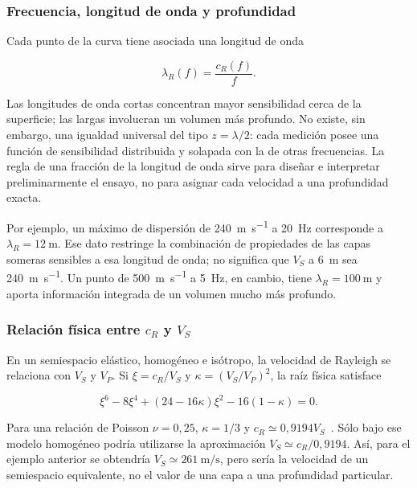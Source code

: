 \subsubsection{Frecuencia, longitud de onda y profundidad}

Cada punto de la curva tiene asociada una longitud de onda

\begin{equation}
    \lambda_R(f)=\frac{c_R(f)}{f}.
    \label{eq:longitud-onda}
\end{equation}

Las longitudes de onda cortas concentran mayor sensibilidad cerca de la superficie;
las largas involucran un volumen más profundo. No existe, sin embargo, una igualdad
universal del tipo $z=\lambda/2$: cada medición posee una función de sensibilidad
distribuida y solapada con la de otras frecuencias. La regla de una fracción de la
longitud de onda sirve para diseñar e interpretar preliminarmente el ensayo, no para
asignar cada velocidad a una profundidad exacta.

Por ejemplo, un máximo de dispersión de \SI{240}{\meter\per\second} a
\SI{20}{\hertz} corresponde a $\lambda_R=\SI{12}{\meter}$. Ese dato restringe la
combinación de propiedades de las capas someras sensibles a esa longitud de onda; no
significa que $V_S$ a \SI{6}{\meter} sea \SI{240}{\meter\per\second}. Un punto de
\SI{500}{\meter\per\second} a \SI{5}{\hertz}, en cambio, tiene
$\lambda_R=\SI{100}{\meter}$ y aporta información integrada de un volumen mucho más
profundo.

\subsubsection{Relación física entre \texorpdfstring{$c_R$ y $V_S$}{cR y Vs}}

En un semiespacio elástico, homogéneo e isótropo, la velocidad de Rayleigh se relaciona
con $V_S$ y $V_P$. Si $\xi=c_R/V_S$ y $\kappa=(V_S/V_P)^2$, la raíz física satisface

\begin{equation}
    \xi^6-8\xi^4+(24-16\kappa)\xi^2-16(1-\kappa)=0.
    \label{eq:rayleigh-homogeneo}
\end{equation}

Para una relación de Poisson $\nu=0{,}25$, $\kappa=1/3$ y
$c_R\simeq0{,}9194V_S$~\cite{Xia1999}. Sólo bajo ese modelo homogéneo podría utilizarse
la aproximación $V_S\simeq c_R/0{,}9194$. Así, para el ejemplo anterior se obtendría
$V_S\simeq\SI{261}{\meter\per\second}$, pero sería la velocidad de un semiespacio
equivalente, no el valor de una capa a una profundidad particular.

